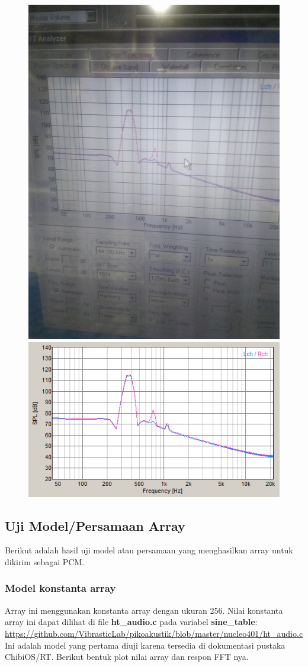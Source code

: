 \documentclass[12pt,]{article}
\begin{document}
\begin{itemize}
		\begin{figure}[H]
			\centering
			\includegraphics[width=0.3\linewidth]{day_1/test0}
			\includegraphics[width=0.6\linewidth]{day_1/test1}
		\end{figure}  
	\end{itemize}

	\subsection{Uji Model/Persamaan Array}
	
	Berikut adalah hasil uji model atau persamaan yang menghasilkan array untuk dikirim sebagai PCM.
	
	\subsubsection{Model konstanta array}
	Array ini menggunakan konstanta array dengan ukuran 256.
	Nilai konstanta array ini dapat dilihat di file \textbf{ht\_audio.c} pada variabel \textbf{sine\_table}:\\
	\url{https://github.com/VibrasticLab/pikoakustik/blob/master/nucleo401/ht_audio.c}\\
	Ini adalah model yang pertama diuji karena tersedia di dokumentasi pustaka ChibiOS/RT.
	Berikut bentuk plot nilai array dan respon FFT nya.
	
\end{document}
